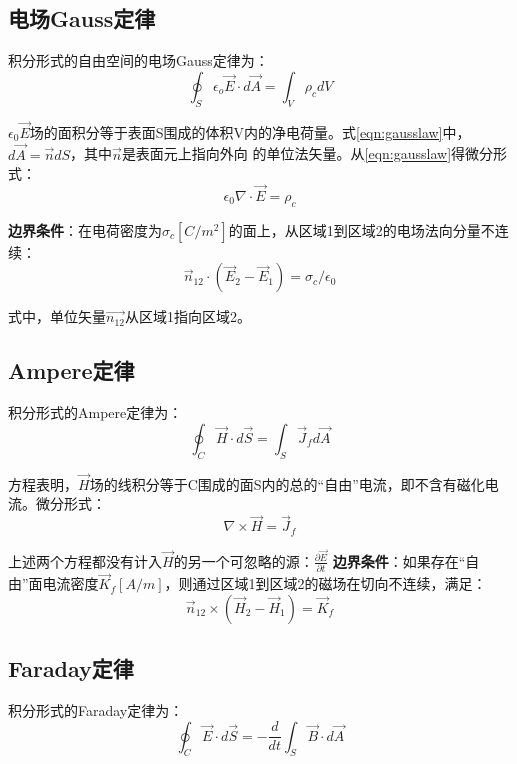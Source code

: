 \subsection{电场Gauss定律}
积分形式的自由空间的电场Gauss定律为：
\begin{equation}\label{eqn:gausslaw}
\oint_S \epsilon_o\vec{E}\cdot d\vec{A}=\int_V\rho_c dV
\end{equation}

$\epsilon_0\vec{E}$场的面积分等于表面S围成的体积V内的净电荷量。式\ref{eqn:gausslaw}中，$d\vec{A} =\vec{n}dS$，其中$\vec{n}$是表面元上指向外向
的单位法矢量。从\ref{eqn:gausslaw}得微分形式：
\begin{equation}\label{eqn:gausslaw diff}
  \epsilon_0 \nabla \cdot \vec{E}=\rho_c
\end{equation}

\textbf{边界条件}：在电荷密度为$\sigma_c[C/m^2]$的面上，从区域1到区域2的电场法向分量不连续：
\begin{equation}\label{eqn:gauss bc}
  \vec{n}_{12}\cdot (\vec{E}_2-\vec{E}_1)=\sigma_c/\epsilon_0
\end{equation}

式中，单位矢量$\vec{n_{12}}$从区域1指向区域2。

\subsection{Ampere定律}
积分形式的Ampere定律为：
\begin{equation}\label{eqn:amperelaw}
\oint_C \vec{H}\cdot d\vec{S}=\int_S \vec{J}_f d\vec{A}
\end{equation}

方程表明，$\vec{H}$场的线积分等于C围成的面S内的总的“自由”电流，即不含有磁化电流。微分形式：
\begin{equation}\label{eqn:amperelaw diff}
   \nabla \times \vec{H}=\vec{J}_f
\end{equation}

上述两个方程都没有计入$\vec{H}$的另一个可忽略的源：$\frac{\partial{\vec{E}}}{\partial{t}}$
\textbf{边界条件}：如果存在“自由”面电流密度$\vec{K}_f[A/m]$，则通过区域1到区域2的磁场在切向不连续，满足：
\begin{equation}\label{eqn:ampere bc}
  \vec{n}_{12}\times (\vec{H}_2-\vec{H}_1)=\vec{K}_f
\end{equation}

\subsection{Faraday定律}
积分形式的Faraday定律为：
\begin{equation}\label{eqn:faradaylaw}
\oint_C \vec{E}\cdot d\vec{S}=-\frac{d}{dt}\int_S \vec{B}\cdot d\vec{A}
\end{equation}

